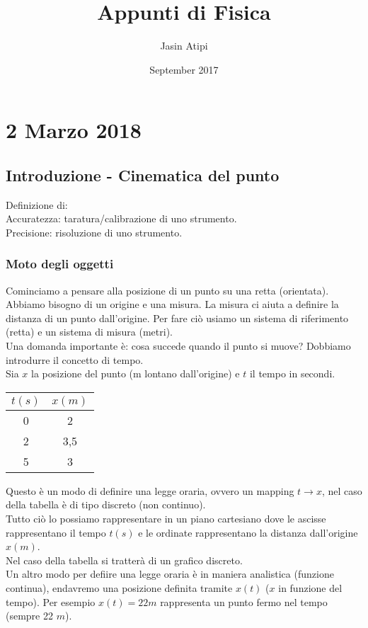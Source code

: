 \documentclass{article}
\title{Appunti di Fisica}
\author{Jasin Atipi}
\date{September 2017}
\begin{document}
\maketitle

\section*{2 Marzo 2018}
\subsection*{Introduzione - Cinematica del punto}
Definizione di:\\
Accuratezza: taratura/calibrazione di uno strumento.\\
Precisione: risoluzione di uno strumento.
\subsubsection*{Moto degli oggetti}
Cominciamo a pensare alla posizione di un punto su una retta (orientata).
Abbiamo bisogno di un origine e una misura. La misura ci aiuta a definire la distanza di un punto
dall'origine. Per fare ci\`{o} usiamo un sistema di riferimento (retta) e un
sistema di misura (metri).\\
Una domanda importante \`{e}: cosa succede quando il punto si muove?
Dobbiamo introdurre il concetto di tempo.\\
Sia $x$ la posizione del punto (m lontano dall'origine) e $t$ il tempo in secondi.\\
\begin{tabular} {c | c}
    $t(s)$ & $x(m)$\\
    \hline
    0 & 2\\
    2 & 3,5\\
    5 & 3
\end{tabular}
Questo \`{e} un modo di definire una legge oraria, ovvero un mapping
$t\to x$, nel caso della tabella \`{e} di tipo discreto (non continuo).\\
Tutto ci\`{o} lo possiamo rappresentare in un piano cartesiano dove le ascisse
rappresentano il tempo $t(s)$ e le ordinate rappresentano la distanza dall'origine $x(m)$.\\
Nel caso della tabella si tratter\`{a} di un grafico discreto.\\
Un altro modo per defiire una legge oraria \`{e} in maniera analistica (funzione continua), endavremo una posizione definita tramite $x(t)$ ($x$ in funzione del tempo).
Per esempio $x(t)=22m$ rappresenta un punto fermo nel tempo (sempre 22 $m$).\\
\end{document}
